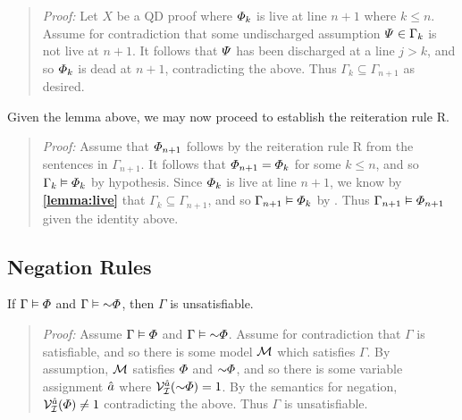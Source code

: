 \begin{quote} 
  \textit{Proof:} Let $X$ be a QD proof where $\varPhi_k$ is live at line $n+1$ where $k\leq n$.
  Assume for contradiction that some undischarged assumption $\varPsi \in \Gamma_k$ is not live at $n+1$.
  It follows that $\varPsi$ has been discharged at a line $j>k$, and so $\varPhi_k$ is dead at $n+1$, contradicting the above.
  Thus $\Gamma_k\subseteq \Gamma_{n+1}$ as desired.
\end{quote}

Given the lemma above, we may now proceed to establish the reiteration rule R.

\label{rule:R}

\begin{quote} 
  \textit{Proof:} Assume that $\varPhi_{n+1}$ follows by the reiteration rule R from the sentences in $\Gamma_{n+1}$.
  It follows that $\varPhi_{n+1}=\varPhi_{k}$ for some $k\leq n$, and so $\Gamma_k \vDash \varPhi_k$ by hypothesis.
  Since $\varPhi_k$ is live at line $n+1$, we know by \textbf{\ref{lemma:live}} that $\Gamma_k\subseteq \Gamma_{n+1}$, and so $\Gamma_{n+1} \vDash \varPhi_{k}$ by .
  Thus $\Gamma_{n+1} \vDash \varPhi_{n+1}$ given the identity above.
\end{quote}



\subsection{Negation Rules}%
  \label{sub:NegationRules}
  
\begin{Lthm} \label{lemma:unsat}
  If $\Gamma \vDash \varPhi$ and $\Gamma \models \enot\metaA$, then $\Gamma$ is unsatisfiable.
\end{Lthm}

\begin{quote} 
  \textit{Proof:} Assume $\Gamma \vDash \varPhi$ and $\Gamma \models \enot\metaA$.
  Assume for contradiction that $\Gamma$ is satisfiable, and so there is some model $\mathcal{M}$ which satisfies $\Gamma$. 
  By assumption, $\mathcal{M}$ satisfies $\varPhi$ and $\enot\metaA$, and so there is some variable assignment $\hat{a}$ where $\VV{\I}{\va{a}}(\enot\metaA)=1$.
  By the semantics for negation, $\mathcal{V}_{\mathcal{I}}^{\hat{a}}(\varPhi)\neq 1$ contradicting the above.
  Thus $\Gamma$ is unsatisfiable. 
\end{quote}





